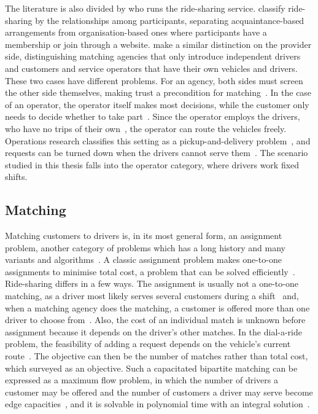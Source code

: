 The literature is also divided by who runs the ride-sharing service. \citet{chan2012ridesharing} classify ride-sharing by the relationships among participants, separating acquaintance-based arrangements from organisation-based ones where participants have a membership or join through a website. \citet{furuhata2013ridesharing} make a similar distinction on the provider side, distinguishing matching agencies that only introduce independent drivers and customers and service operators that have their own vehicles and drivers. These two cases have different problems. For an agency, both sides must screen the other side themselves, making trust a precondition for matching~\citep{chaube2010trust}. In the case of an operator, the operator itself makes most decisions, while the customer only needs to decide whether to take part~\citep{furuhata2013ridesharing}. Since the operator employs the drivers, who have no trips of their own~\citep{furuhata2013ridesharing}, the operator can route the vehicles freely. Operations research classifies this setting as a pickup-and-delivery problem~\citep{savelsbergh1995general}, and requests can be turned down when the drivers cannot serve them~\citep{cordeau2007dialaride}. The scenario studied in this thesis falls into the operator category, where drivers work fixed shifts.

\subsection{Matching}

Matching customers to drivers is, in its most general form, an assignment problem, another category of problems which has a long history and many variants and algorithms~\citep{pentico2007assignment}. A classic assignment problem makes one-to-one assignments to minimise total cost, a problem that can be solved efficiently~\citep{pentico2007assignment, edmonds1972theoretical}. Ride-sharing differs in a few ways. The assignment is usually not a one-to-one matching, as a driver most likely serves several customers during a shift~\citep{savelsbergh1995general} and, when a matching agency does the matching, a customer is offered more than one driver to choose from~\citep{dailey1999seattle}. Also, the cost of an individual match is unknown before assignment because it depends on the driver's other matches. In the dial-a-ride problem, the feasibility of adding a request depends on the vehicle's current route~\citep{cordeau2007dialaride}. The objective can then be the number of matches rather than total cost, which \citet{agatz2012optimization} surveyed as an objective. Such a capacitated bipartite matching can be expressed as a maximum flow problem, in which the number of drivers a customer may be offered and the number of customers a driver may serve become edge capacities~\citep{ford1957simple}, and it is solvable in polynomial time with an integral solution~\citep{edmonds1972theoretical}.

